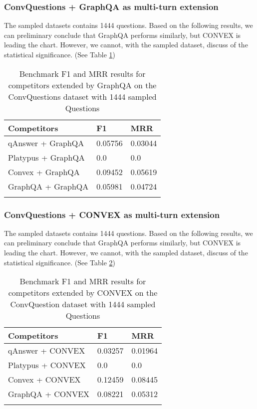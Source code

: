 \subsubsection{ConvQuestions + GraphQA as multi-turn extension}
The sampled datasets contains 1444 questions. Based on the following results, we can preliminary conclude that GraphQA performs similarly, but CONVEX is leading the chart. However, we cannot, with the sampled dataset, discuss of the statistical significance. (See Table \ref{tab:results-benchmark-convq-graphqa})

\begin{longtable}[c]{@{}lll@{}}
\toprule
Competitors        & F1                   & MRR                  \\* \midrule
\endhead
%
\bottomrule
\endfoot
%
\endlastfoot
%
qAnswer + GraphQA  & 0.05756   & 0.03044  \\
Platypus + GraphQA & 0.0                  & 0.0                  \\
Convex + GraphQA   & 0.09452  & 0.05619  \\
GraphQA + GraphQA  & 0.05981 & 0.04724 \\* \bottomrule
\caption{Benchmark F1 and MRR results for competitors extended by GraphQA on the ConvQuestions dataset with 1444 sampled Questions}
\label{tab:results-benchmark-convq-graphqa}\\
\end{longtable}

\subsubsection{ConvQuestions + CONVEX as multi-turn extension}
The sampled datasets contains 1444 questions. Based on the following results, we can preliminary conclude that GraphQA performs similarly, but CONVEX is leading the chart. However, we cannot, with the sampled dataset, discuss of the statistical significance. (See Table \ref{tab:results-benchmark-convq-convex}) 

\begin{longtable}[c]{@{}lll@{}}
\toprule
Competitors       & F1                  & MRR                  \\* \midrule
\endhead
%
\bottomrule
\endfoot
%
\endlastfoot
%
qAnswer + CONVEX  & 0.03257 & 0.01964 \\
Platypus + CONVEX & 0.0                 & 0.0                  \\
Convex + CONVEX   & 0.12459 & 0.08445  \\
GraphQA + CONVEX  & 0.08221  & 0.05312  \\* \bottomrule
\caption{Benchmark F1 and MRR results for competitors extended by CONVEX on the ConvQuestion dataset with 1444 sampled Questions}
\label{tab:results-benchmark-convq-convex}\\
\end{longtable}

